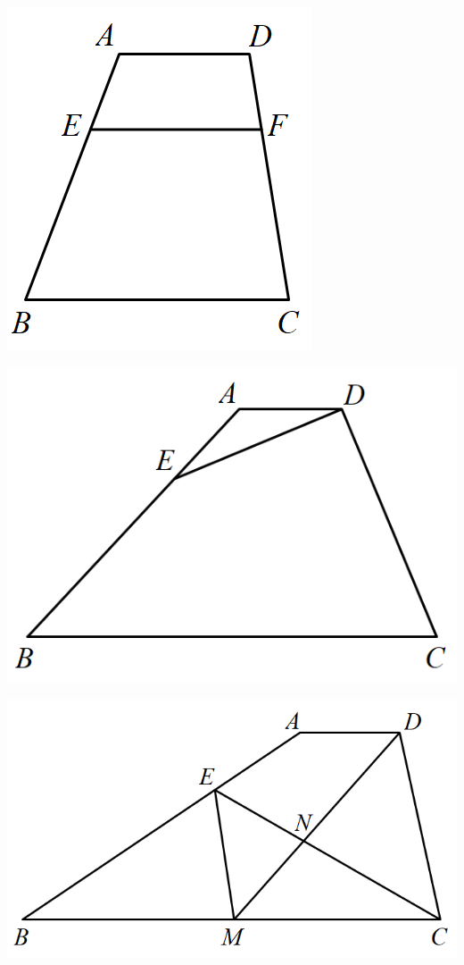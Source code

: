 \documentclass{article}
\begin{document}
\noindent\begin{minipage}[b]{.24\textwidth}
    \centering
    \vspace{-2ex}
    \includegraphics[scale=0.3]{images/p7.png}
\end{minipage}
\begin{minipage}[b]{.36\textwidth}
    \centering
    \vspace{-2ex}
    \includegraphics[scale=0.3]{images/p8-2.png}
\end{minipage}
\begin{minipage}[b]{.44\textwidth}
    \centering
    \vspace{-2ex}
    \includegraphics[scale=0.3]{images/p9-2.png}
\end{minipage}
\end{document}
